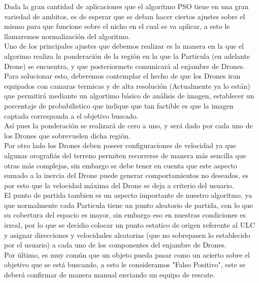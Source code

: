 \documentclass[journal]{IEEEtran}
\begin{document}
Dada la gran cantidad de aplicaciones que el algoritmo PSO tiene en una gran variedad de ambitos, es de esperar que se deban hacer ciertos ajustes sobre el mismo para que funcione sobre el nicho en el cual se va aplicar, a esto le llamaremos normalización del algoritmo.\\

Uno de los principales ajustes que debemos realizar es la manera en la que el algorimo realiza la ponderación de la región en la que la Particula (en adelante Drone) se encuentra, y que posteriormete comunicará al enjambre de Drones.\\

Para solucionar esto, deberemos contemplar el hecho de que los Drones iran equipados con camaras termicas y de alta resolución (Actualmente ya lo están) que permitirá mediante un algortimo básico de análisis de imagen, establecer un porcentaje de probabilistico que indique que tan factible es que la imagen captada corresponda a el objetivo buscado.\\

Así pues la ponderación se realizará de cero a uno, y será dado por cada uno de los Drones que sobrevuelen dicha región.\\

Por otro lado los Drones deben poseer configuraciones de velocidad ya que algunas orografiás del terreno permiten recorrerse de manera más sencilla que otras más complejas, sin embargo se debe tener en cuenta que este aspecto sumado a la inercia del Drone puede generar comportamientos no deseados, es por esto que la velocidad máxima del Drone se deja a criterio del usuario.\\
 
El punto de partida tambien es un aspecto importante de nuestro algoritmo, ya que normalmente cada Particula tiene un punto aleatorio de partida, con lo que su cobertura del espacio es mayor, sin embargo eso en nuestras condiciones es irreal, por lo que se decidio colocar un punto estatico de origen referente al ULC y asignar direcciones y velocidades aleatorias (que no sobrepasen lo establecido por el usuario) a cada uno de los componentes del enjambre de Drones.\\

Por último, es muy común que un objeto pueda pasar como un acierto sobre el objetivo que se está buscando, a esto le consideramos "Falso Positivo", este se deberá confirmar de manera manual enviando un equipo de rescate.\\
 
\end{document}
